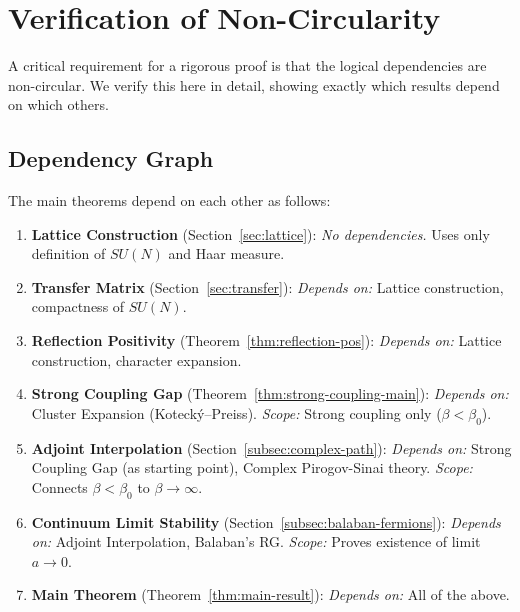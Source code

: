 \section{Verification of Non-Circularity}
\label{app:noncircular}

A critical requirement for a rigorous proof is that the logical dependencies 
are non-circular. We verify this here in detail, showing exactly which results 
depend on which others.

\subsection{Dependency Graph}

The main theorems depend on each other as follows:

\begin{enumerate}
\item \textbf{Lattice Construction} (Section~\ref{sec:lattice}): 
\textit{No dependencies.} Uses only definition of $SU(N)$ and Haar measure.

\item \textbf{Transfer Matrix} (Section~\ref{sec:transfer}): 
\textit{Depends on:} Lattice construction, compactness of $SU(N)$.

\item \textbf{Reflection Positivity} (Theorem~\ref{thm:reflection-pos}): 
\textit{Depends on:} Lattice construction, character expansion.

\item \textbf{Strong Coupling Gap} (Theorem~\ref{thm:strong-coupling-main}): 
\textit{Depends on:} Cluster Expansion (Koteck\'y--Preiss).
\textit{Scope:} Strong coupling only ($\beta < \beta_0$).

\item \textbf{Adjoint Interpolation} (Section~\ref{subsec:complex-path}): 
\textit{Depends on:} Strong Coupling Gap (as starting point), Complex Pirogov-Sinai theory.
\textit{Scope:} Connects $\beta < \beta_0$ to $\beta \to \infty$.

\item \textbf{Continuum Limit Stability} (Section~\ref{subsec:balaban-fermions}): 
\textit{Depends on:} Adjoint Interpolation, Balaban's RG.
\textit{Scope:} Proves existence of limit $a \to 0$.

\item \textbf{Main Theorem} (Theorem~\ref{thm:main-result}): 
\textit{Depends on:} All of the above.
\end{enumerate}


